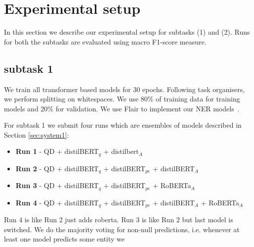 \documentclass[11pt]{article}
\begin{document}
\section{Experimental setup}
In this section we describe our experimental setup for subtasks (1) and (2). 
%
%
%
Runs for both the subtasks are evaluated using macro F1-score measure.
%
%
%
\subsection{subtask 1}

We train all transformer based models for 30 epochs. 
Following task organisers, we perform splitting on whitespaces.
We use 80\% of training data for training models and 20\% for validation.
We use Flair to implement our NER models~\cite{Akbik2019FLAIRAE}.

For subtask 1 we submit four runs which are ensembles of models described in Section \ref{sec:system1}:

\begin{itemize}
\item \textbf{Run 1} - QD + distilBERT$_q$ + distilbert$_A$
\item \textbf{Run 2} - QD + distilBERT$_q$ + distilBERT$_{pe}$ + distilBERT$_A$
\item \textbf{Run 3} - QD + distilBERT$_q$ + distilBERT$_{pe}$ + RoBERTa$_A$
\item \textbf{Run 4} - QD + distilBERT$_q$ + distilBERT$_{pe}$ + distilBERT$_A$ + RoBERTa$_A$ 
\end{itemize}

Run 4 is like Run 2 just adds roberta.
Run 3 is like Run 2 but last model is switched.
We do the majority voting for non-null predictions, i.e. whenever at least one model predicts some entity we 

%
%
%
\end{document}
